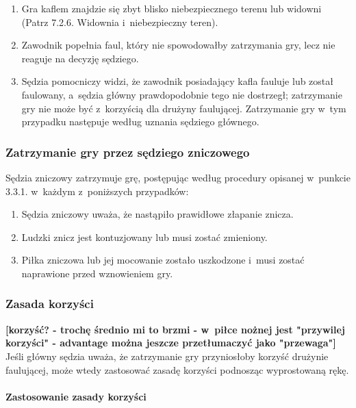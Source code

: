 \documentclass[12pt]{article}
\begin{document}
\begin{enumerate}
	\item Gra kaflem znajdzie się zbyt blisko niebezpiecznego terenu lub
	      widowni (Patrz 7.2.6. Widownia i~niebezpieczny teren).

	\item Zawodnik popełnia faul, który nie spowodowałby zatrzymania gry, lecz
	      nie reaguje na decyzję sędziego.

	\item Sędzia pomocniczy widzi, że zawodnik posiadający kafla fauluje lub
	      został faulowany, a~sędzia główny prawdopodobnie tego nie dostrzegł;
	      zatrzymanie gry nie może być z~korzyścią dla drużyny faulującej.
	      Zatrzymanie gry w~tym przypadku następuje według uznania sędziego
	      głównego.
\end{enumerate}

\subsubsection{Zatrzymanie gry przez sędziego zniczowego}

Sędzia zniczowy zatrzymuje grę, postępując według procedury opisanej w~punkcie 3.3.1. w~każdym z~poniższych przypadków:

\begin{enumerate}
	\item
	      Sędzia zniczowy uważa, że nastąpiło prawidłowe złapanie znicza.
	\item
	      Ludzki znicz jest kontuzjowany lub musi zostać zmieniony.
	\item
	      Piłka zniczowa lub jej mocowanie zostało uszkodzone i~musi zostać
	      naprawione przed wznowieniem gry.
\end{enumerate}

\subsubsection{Zasada korzyści}
\textbf{[korzyść? - trochę średnio mi to brzmi - w~piłce nożnej jest "przywilej korzyści" - advantage można jeszcze przetłumaczyć jako "przewaga"]}
Jeśli główny sędzia uważa, że zatrzymanie gry przyniosłoby korzyść
drużynie faulującej, może wtedy zastosować zasadę korzyści podnosząc
wyprostowaną rękę.

\paragraph{Zastosowanie zasady korzyści}
\end{document}
